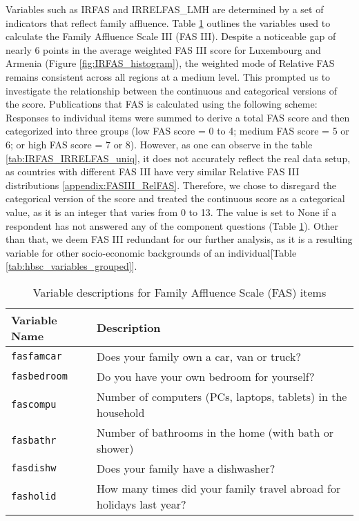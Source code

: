 \documentclass[main.tex]{subfiles}
\begin{document}
Variables such as IRFAS and IRRELFAS\_LMH are determined by a set of indicators that reflect family affluence. Table \ref{tab:FAS_variables} outlines the variables used to calculate the Family Affluence Scale III (FAS III). Despite a noticeable gap of nearly 6 points in the average weighted FAS III score for Luxembourg and Armenia (Figure \ref{fig:IRFAS_histogram}), the weighted mode of Relative FAS remains consistent across all regions at a medium level. This prompted us to investigate the relationship between the continuous and categorical versions of the score. Publications\cite{McCormack2011} that FAS is calculated using the following scheme: Responses to individual items were summed to derive a total FAS score and then categorized into three groups (low FAS score = 0 to 4; medium FAS score = 5 or 6; or high FAS score = 7 or 8). However, as one can observe in the table  \ref{tab:IRFAS_IRRELFAS_uniq}, it does not accurately reflect the real data setup, as countries with different FAS III have very similar Relative FAS III distributions \ref{appendix:FASIII_RelFAS}. Therefore, we chose to disregard the categorical version of the score and treated the continuous score as a categorical value, as it is an integer that varies from 0 to 13. The value is set to None if a respondent has not answered any of the component questions (Table \ref{tab:FAS_variables}). Other than that, we deem FAS III redundant for our further analysis, as it is a resulting variable for other socio-economic backgrounds of an individual[Table \ref{tab:hbsc_variables_grouped}].
\begin{table}[h]
\centering
\begin{tabular}{|l|l@{}|}
\toprule
\textbf{Variable Name} & \textbf{Description} \\
\midrule
\texttt{fasfamcar}   & Does your family own a car, van or truck? \\
\texttt{fasbedroom}  & Do you have your own bedroom for yourself? \\
\texttt{fascompu}    & Number of computers (PCs, laptops, tablets) in the household \\
\texttt{fasbathr}    & Number of bathrooms in the home (with bath or shower) \\
\texttt{fasdishw}    & Does your family have a dishwasher? \\
\texttt{fasholid}    & How many times did your family travel abroad for holidays last year? \\
\bottomrule
\end{tabular}
\caption{Variable descriptions for Family Affluence Scale (FAS) items}
\label{tab:FAS_variables}
\end{table}
\end{document}
